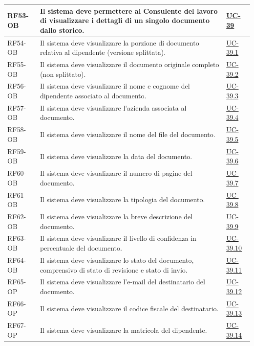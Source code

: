 ﻿\documentclass[a4paper,12pt]{article}
\begin{document}
\begin{description}[style=multiline, leftmargin=4cm, font=\bfseries]
\begin{enumerate}[leftmargin=*, nosep]
{\begin{longtable}{|p{2.5cm}|p{9.5cm}|p{3.5cm}|}
    \hline
    RF53-OB & Il sistema deve permettere al Consulente del lavoro di visualizzare i dettagli di un singolo documento dallo storico. & \hyperref[fig:uc-39]{UC-39} \\
    \hline
    RF54-OB & Il sistema deve visualizzare la porzione di documento relativa al dipendente (versione splittata). & \hyperref[fig:uc-39.1]{UC-39.1} \\
    \hline
    RF55-OB & Il sistema deve visualizzare il documento originale completo (non splittato). & \hyperref[fig:uc-39.2]{UC-39.2} \\
    \hline
    RF56-OB & Il sistema deve visualizzare il nome e cognome del dipendente associato al documento. & \hyperref[fig:uc-39.3]{UC-39.3} \\
    \hline
    RF57-OB & Il sistema deve visualizzare l'azienda associata al documento. & \hyperref[fig:uc-39.4]{UC-39.4} \\
    \hline
    RF58-OB & Il sistema deve visualizzare il nome del file del documento. & \hyperref[fig:uc-39.5]{UC-39.5} \\
    \hline
    RF59-OB & Il sistema deve visualizzare la data del documento. & \hyperref[fig:uc-39.6]{UC-39.6} \\
    \hline
    RF60-OB & Il sistema deve visualizzare il numero di pagine del documento. & \hyperref[fig:uc-39.7]{UC-39.7} \\
    \hline
    RF61-OB & Il sistema deve visualizzare la tipologia del documento. & \hyperref[fig:uc-39.8]{UC-39.8} \\
    \hline
    RF62-OB & Il sistema deve visualizzare la breve descrizione del documento. & \hyperref[fig:uc-39.9]{UC-39.9} \\
    \hline
    RF63-OB & Il sistema deve visualizzare il livello di confidenza in percentuale del documento. & \hyperref[fig:uc-39.10]{UC-39.10} \\
    \hline
    RF64-OB & Il sistema deve visualizzare lo stato del documento, comprensivo di stato di revisione e stato di invio. & \hyperref[fig:uc-39.11]{UC-39.11} \\
    \hline
    RF65-OP & Il sistema deve visualizzare l'e-mail del destinatario del documento. & \hyperref[fig:uc-39.12]{UC-39.12} \\
    \hline
    RF66-OP & Il sistema deve visualizzare il codice fiscale del destinatario. & \hyperref[fig:uc-39.13]{UC-39.13} \\
    \hline
    RF67-OP & Il sistema deve visualizzare la matricola del dipendente. & \hyperref[fig:uc-39.14]{UC-39.14} \\

\end{longtable}}
\end{enumerate}
\end{description}
\end{document}
